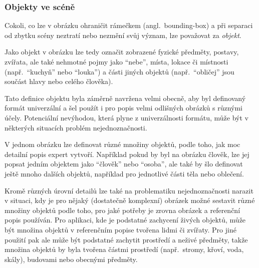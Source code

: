 \newpage
\subsubsection{Objekty ve scéně}\label{subsubsec:objekty_ve_scene}
\newcommand{\objekt}{{\color{red!70!black}\texttt{objekt}}}
Cokoli, co lze v obrázku ohraničit rámečkem (angl.~bounding-box)
a při separaci od zbytku scény neztratí nebo nezmění svůj význam,
lze považovat za \emph{objekt}.

Jako objekt v obrázku lze tedy označit zobrazené fyzické předměty, postavy, zvířata, ale také nehmotné pojmy jako \enquote{nebe},
místa, lokace či místnosti (např.~\enquote{kuchyň} nebo \enquote{louka}) a části jiných objektů (např.~\enquote{obličej}
jsou součást hlavy nebo celého člověka).

Tato definice objektu byla záměrně navržena velmi obecně, aby byl definovaný formát univerzální a šel použít i pro
popis velmi odlišných obrázků s různými účely.
Potenciální nevýhodou, která plyne z univerzálnosti formátu, může být v některých situacích problém nejednoznačnosti.

V jednom obrázku lze definovat různé množiny objektů, podle toho, jak moc detailní popis expert vytvoří.
Například pokud by byl na obrázku člověk, lze jej popsat jedním objektem jako \enquote{člověk} nebo \enquote{osoba},
ale také by šlo definovat ještě mnoho dalších objektů, například pro jednotlivé části těla nebo oblečení.

Kromě různých úrovní detailů lze také na problematiku nejednoznačnosti narazit v situaci, kdy je pro nějaký (dostatečně komplexní) obrázek
možné sestavit různé množiny objektů podle toho, pro jaké potřeby je zrovna obrázek a referenční popis používán.
Pro aplikaci, kde je podstatné zachycení živých objektů, může být množina objektů v referenčním popise tvořena lidmi či zvířaty.
Pro jiné použití pak ale může být podstatné zachytit prostředí a neživé předměty,
takže množina objektů by byla tvořena částmi prostředí (např.~stromy, křoví, voda, skály), budovami nebo obecnými předměty.

